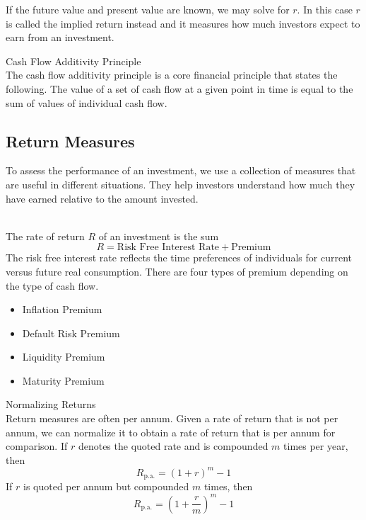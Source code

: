 \documentclass[a4paper]{article}
\begin{document}
If the future value and present value are known, we may solve for $r$. In this case $r$ is called the implied return instead and it measures how much investors expect to earn from an investment. 

\begin{cpt}{Cash Flow Additivity Principle}{}\\
The cash flow additivity principle is a core financial principle that states the following. The value of a set of cash flow at a given point in time is equal to the sum of values of individual cash flow. 
\end{cpt}

\subsection{Return Measures}
To assess the performance of an investment, we use a collection of measures that are useful in different situations. They help investors understand how much they have earned relative to the amount invested. \\

\begin{cpt}{}{}\\
The rate of return $R$ of an investment is the sum $$R=\text{Risk Free Interest Rate}+\text{Premium}$$ The risk free interest rate reflects the time preferences of individuals for current versus future real consumption. There are four types of premium depending on the type of cash flow. 
\begin{itemize}
\item Inflation Premium
\item Default Risk Premium
\item Liquidity Premium
\item Maturity Premium
\end{itemize}
\end{cpt}

\begin{cpt}{Normalizing Returns}{}\\
Return measures are often per annum. Given a rate of return that is not per annum, we can normalize it to obtain a rate of return that is per annum for comparison. If $r$ denotes the quoted rate and is compounded $m$ times per year, then $$R_\text{p.a.}=(1+r)^m-1$$ If $r$ is quoted per annum but compounded $m$ times, then $$R_\text{p.a.}=\left(1+\frac{r}{m}\right)^m-1$$
\end{cpt}
\end{document}
